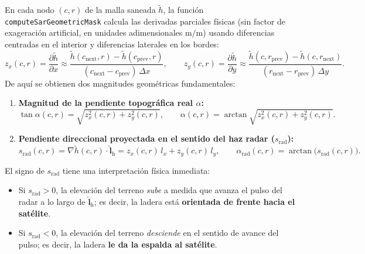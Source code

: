 \documentclass[11pt,a4paper]{article}
\newcommand{\unit}[1]{\mathrm{#1}}
\begin{document}
En cada nodo $(c,r)$ de la malla saneada $\tilde h$, la función \texttt{computeSarGeometricMask} calcula las
derivadas parciales físicas (sin factor de exageración artificial, en unidades adimensionales $\unit{m/m}$)
usando diferencias centradas en el interior y diferencias laterales en los bordes:
\begin{equation}
  z_x(c,r) = \frac{\partial \tilde h}{\partial x}
  \approx \frac{\tilde h(c_{\mathrm{next}},r) - \tilde h(c_{\mathrm{prev}},r)}{(c_{\mathrm{next}} - c_{\mathrm{prev}})\,\Delta x},
  \qquad
  z_y(c,r) = \frac{\partial \tilde h}{\partial y}
  \approx \frac{\tilde h(c,r_{\mathrm{prev}}) - \tilde h(c,r_{\mathrm{next}})}{(r_{\mathrm{next}} - r_{\mathrm{prev}})\,\Delta y}.
  \label{eq:derivadas-reales-sar}
\end{equation}
De aquí se obtienen dos magnitudes geométricas fundamentales:
\begin{enumerate}
  \item \textbf{Magnitud de la pendiente topográfica real $\alpha$:}
        \begin{equation}
          \tan\alpha(c,r) = \sqrt{z_x^2(c,r) + z_y^2(c,r)},
          \qquad
          \alpha(c,r) = \arctan\sqrt{z_x^2(c,r) + z_y^2(c,r)}.
          \label{eq:pendiente-real}
        \end{equation}
  \item \textbf{Pendiente direccional proyectada en el sentido del haz radar ($s_{\mathrm{rad}}$):}
        \begin{equation}
          s_{\mathrm{rad}}(c,r) = \nabla\tilde h(c,r)\cdot\hat{\mathbf l}_{\mathrm{h}}
          = z_x(c,r)\,l_x + z_y(c,r)\,l_y,
          \qquad
          \alpha_{\mathrm{rad}}(c,r) = \arctan\bigl(s_{\mathrm{rad}}(c,r)\bigr).
          \label{eq:pendiente-proyectada}
        \end{equation}
\end{enumerate}

El signo de $s_{\mathrm{rad}}$ tiene una interpretación física inmediata:
\begin{itemize}
  \item Si $s_{\mathrm{rad}} > 0$, la elevación del terreno \emph{sube} a medida que avanza el pulso del radar
        a lo largo de $\hat{\mathbf l}_{\mathrm{h}}$; es decir, la ladera está \textbf{orientada de frente hacia
        el satélite}.
  \item Si $s_{\mathrm{rad}} < 0$, la elevación del terreno \emph{desciende} en el sentido de avance del pulso;
        es decir, la ladera \textbf{le da la espalda al satélite}.
\end{itemize}
\end{document}
